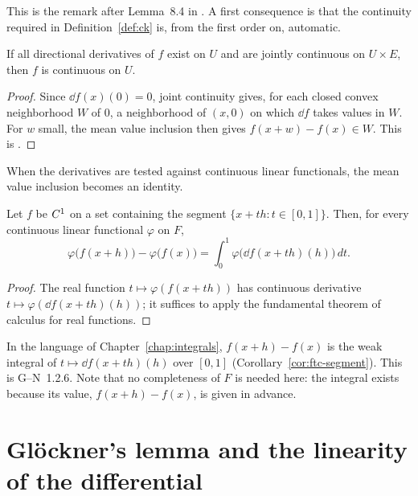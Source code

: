 This is the remark after Lemma~8.4 in \cite{Mic80}. A first consequence is that the continuity
required in Definition~\ref{def:ck} is, from the first order on, automatic.

\begin{lemma}[Continuity]
  \label{lem:continuity}
  \leanok
  If all directional derivatives of $f$ exist on $U$ and are jointly continuous on $U \times E$,
  then $f$ is continuous on $U$.
\end{lemma}

\begin{proof}
  \leanok
  Since $\dd f(x)(0) = 0$, joint continuity gives, for each closed convex neighborhood $W$ of
  $0$, a neighborhood of $(x, 0)$ on which $\dd f$ takes values in $W$. For $w$ small, the
  mean value inclusion then gives $f(x + w) - f(x) \in W$. This is \cite[8.1]{Mic80}.
\end{proof}

When the derivatives are tested against continuous linear functionals, the mean value inclusion
becomes an identity.

\begin{proposition}
  \label{prop:mean-value-weak}
  \leanok
  Let $f$ be $C^{1}$ on a set containing the segment $\{x + t h : t \in [0,1]\}$. Then, for
  every continuous linear functional $\varphi$ on $F$,
  \[
    \varphi\bigl(f(x+h)\bigr) - \varphi\bigl(f(x)\bigr)
      = \int_0^1 \varphi\bigl(\dd f(x + t h)(h)\bigr)\, dt .
  \]
\end{proposition}

\begin{proof}
  \leanok
  The real function $t \mapsto \varphi(f(x + t h))$ has continuous derivative
  $t \mapsto \varphi(\dd f(x + th)(h))$; it suffices to apply the fundamental theorem of
  calculus for real functions.
\end{proof}

In the language of Chapter~\ref{chap:integrals}, $f(x+h) - f(x)$ is the weak integral of
$t \mapsto \dd f(x + th)(h)$ over $[0,1]$ (Corollary~\ref{cor:ftc-segment}). This is G--N~1.2.6.
Note that no completeness of $F$ is needed here: the integral exists because its value,
$f(x+h) - f(x)$, is given in advance.

\section{Glöckner's lemma and the linearity of the differential}

